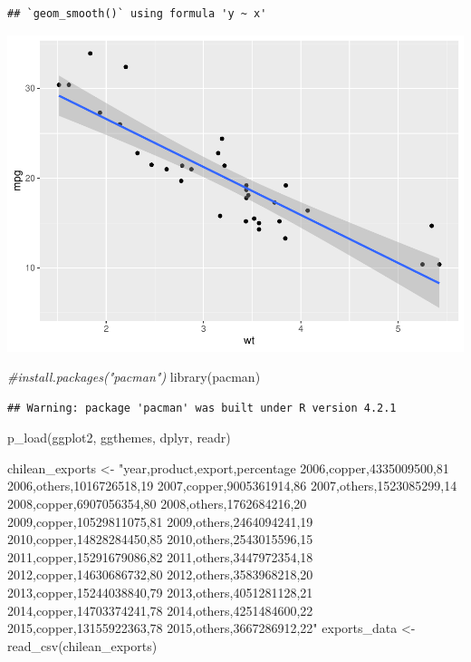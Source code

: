 \documentclass[
]{article}
\newenvironment{Shaded}{\begin{snugshade}}{\end{snugshade}}
\newcommand{\CommentTok}[1]{\textcolor[rgb]{0.56,0.35,0.01}{\textit{#1}}}
\newcommand{\FunctionTok}[1]{\textcolor[rgb]{0.00,0.00,0.00}{#1}}
\newcommand{\NormalTok}[1]{#1}
\newcommand{\OtherTok}[1]{\textcolor[rgb]{0.56,0.35,0.01}{#1}}
\newcommand{\StringTok}[1]{\textcolor[rgb]{0.31,0.60,0.02}{#1}}
\begin{document}
\begin{verbatim}
## `geom_smooth()` using formula 'y ~ x'
\end{verbatim}

\includegraphics{practica1_files/figure-latex/unnamed-chunk-4-1.pdf}

\begin{Shaded}
\begin{Highlighting}[]
\CommentTok{\#install.packages("pacman")}
\FunctionTok{library}\NormalTok{(pacman)}
\end{Highlighting}
\end{Shaded}

\begin{verbatim}
## Warning: package 'pacman' was built under R version 4.2.1
\end{verbatim}

\begin{Shaded}
\begin{Highlighting}[]
\FunctionTok{p\_load}\NormalTok{(ggplot2, ggthemes, dplyr, readr)}
\end{Highlighting}
\end{Shaded}

\begin{Shaded}
\begin{Highlighting}[]
\NormalTok{chilean\_exports }\OtherTok{\textless{}{-}} \StringTok{"year,product,export,percentage}
\StringTok{2006,copper,4335009500,81}
\StringTok{2006,others,1016726518,19}
\StringTok{2007,copper,9005361914,86}
\StringTok{2007,others,1523085299,14}
\StringTok{2008,copper,6907056354,80}
\StringTok{2008,others,1762684216,20}
\StringTok{2009,copper,10529811075,81}
\StringTok{2009,others,2464094241,19}
\StringTok{2010,copper,14828284450,85}
\StringTok{2010,others,2543015596,15}
\StringTok{2011,copper,15291679086,82}
\StringTok{2011,others,3447972354,18}
\StringTok{2012,copper,14630686732,80}
\StringTok{2012,others,3583968218,20}
\StringTok{2013,copper,15244038840,79}
\StringTok{2013,others,4051281128,21}
\StringTok{2014,copper,14703374241,78}
\StringTok{2014,others,4251484600,22}
\StringTok{2015,copper,13155922363,78}
\StringTok{2015,others,3667286912,22"}
\NormalTok{exports\_data }\OtherTok{\textless{}{-}} \FunctionTok{read\_csv}\NormalTok{(chilean\_exports)}
\end{Highlighting}
\end{Shaded}
\end{document}
